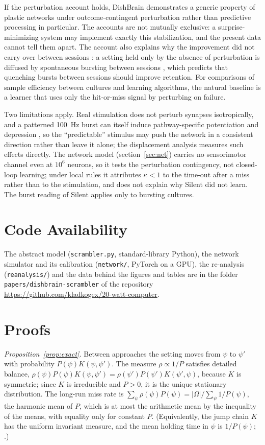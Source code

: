 \documentclass[12pt]{article}
\numberwithin{equation}{section}
\begin{document}
If the perturbation account holds, DishBrain demonstrates a generic property of plastic networks under outcome-contingent perturbation rather than predictive processing in particular. The accounts are not mutually exclusive: a surprise-minimizing system may implement exactly this stabilization, and the present data cannot tell them apart. The account also explains why the improvement did not carry over between sessions \citep{Kagan2022}: a setting held only by the absence of perturbation is diffused by spontaneous bursting between sessions \citep{Chao2005}, which predicts that quenching bursts between sessions should improve retention. For comparisons of sample efficiency between cultures and learning algorithms, the natural baseline is a learner that uses only the hit-or-miss signal by perturbing on failure.

Two limitations apply. Real stimulation does not perturb synapses isotropically, and a patterned 100~Hz burst can itself induce pathway-specific potentiation and depression \citep{Jimbo1999}, so the ``predictable'' stimulus may push the network in a consistent direction rather than leave it alone; the displacement analysis measures such effects directly. The network model (section~\ref{sec:net}) carries no sensorimotor channel even at $10^6$ neurons, so it tests the perturbation contingency, not closed-loop learning; under local rules it attributes $\kappa<1$ to the time-out after a miss rather than to the stimulation, and does not explain why Silent did not learn. The burst reading of Silent applies only to bursting cultures.

\section*{Code Availability}
The abstract model (\texttt{scrambler.py}, standard-library Python), the network simulator and its calibration (\texttt{network/}, PyTorch on a GPU), the re-analysis (\texttt{reanalysis/}) and the data behind the figures and tables are in the folder \texttt{papers/\allowbreak dishbrain-scrambler} of the repository\\ \url{https://github.com/kladkogex/20-watt-computer}.

\appendix
\section{Proofs}\label{app:proofs}

\emph{Proposition~\ref{prop:exact}.} Between approaches the setting moves from $\psi$ to $\psi'$ with probability $P(\psi)K(\psi,\psi')$. The measure $\rho\propto1/P$ satisfies detailed balance, $\rho(\psi)P(\psi)K(\psi,\psi')=\rho(\psi')P(\psi')K(\psi',\psi)$, because $K$ is symmetric; since $K$ is irreducible and $P>0$, it is the unique stationary distribution. The long-run miss rate is $\sum_\psi\rho(\psi)P(\psi)=|\Omega|/\sum_\psi1/P(\psi)$, the harmonic mean of $P$, which is at most the arithmetic mean by the inequality of the means, with equality only for constant $P$. (Equivalently, the jump chain $K$ has the uniform invariant measure, and the mean holding time in $\psi$ is $1/P(\psi)$; \citealp{Norris1997}.)
\end{document}
